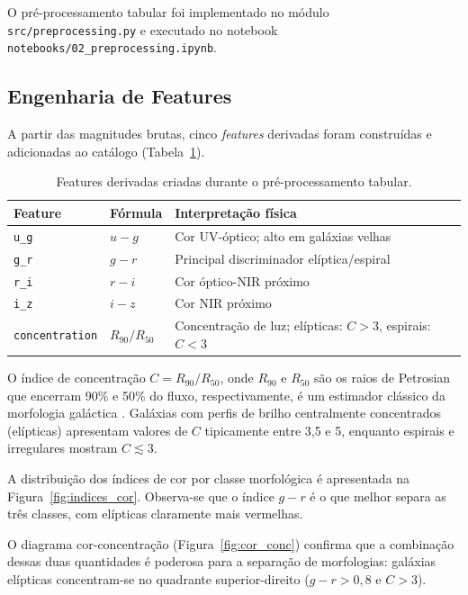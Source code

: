 \documentclass[12pt, a4paper]{article}
\begin{document}
O pré-processamento tabular foi implementado no módulo
\texttt{src/preprocessing.py} e executado no notebook
\texttt{notebooks/02\_preprocessing.ipynb}.

\subsection{Engenharia de Features}

A partir das magnitudes brutas, cinco \textit{features} derivadas foram
construídas e adicionadas ao catálogo (Tabela~\ref{tab:features_derivadas}).

\begin{table}[H]
  \centering
  \caption{Features derivadas criadas durante o pré-processamento tabular.}
  \label{tab:features_derivadas}
  \begin{tabular}{llp{7cm}}
    \toprule
    \textbf{Feature} & \textbf{Fórmula} & \textbf{Interpretação física} \\
    \midrule
    \texttt{u\_g} & $u - g$ & Cor UV-óptico; alto em galáxias velhas \\
    \texttt{g\_r} & $g - r$ & Principal discriminador elíptica/espiral \\
    \texttt{r\_i} & $r - i$ & Cor óptico-NIR próximo \\
    \texttt{i\_z} & $i - z$ & Cor NIR próximo \\
    \texttt{concentration} & $R_{90}/R_{50}$ & Concentração de luz; elípticas: $C > 3$, espirais: $C < 3$ \\
    \bottomrule
  \end{tabular}
\end{table}

O índice de concentração $C = R_{90}/R_{50}$, onde $R_{90}$ e $R_{50}$ são os
raios de Petrosian que encerram 90\% e 50\% do fluxo, respectivamente, é um
estimador clássico da morfologia galáctica \cite{conselice2003}. Galáxias com
perfis de brilho centralmente concentrados (elípticas) apresentam valores de
$C$ tipicamente entre 3{,}5 e 5, enquanto espirais e irregulares mostram $C
\lesssim 3$.

A distribuição dos índices de cor por classe morfológica é apresentada na
Figura~\ref{fig:indices_cor}. Observa-se que o índice $g-r$ é o que melhor
separa as três classes, com elípticas claramente mais vermelhas.

O diagrama cor-concentração (Figura~\ref{fig:cor_conc}) confirma que a
combinação dessas duas quantidades é poderosa para a separação de morfologias:
galáxias elípticas concentram-se no quadrante superior-direito ($g-r > 0{,}8$
e $C > 3$).
\end{document}
